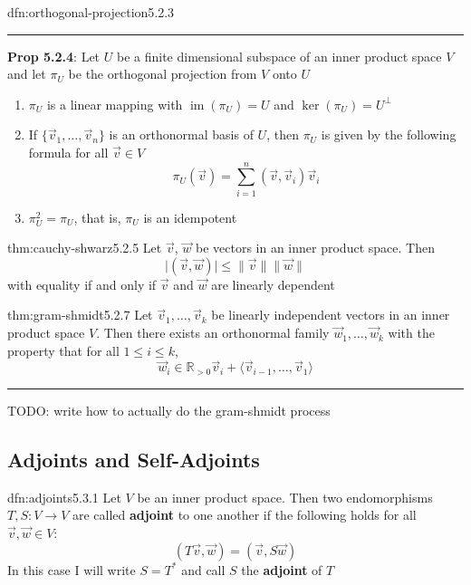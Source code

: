 \documentclass[landscape, 8pt]{extarticle}
\DeclareMathOperator{\im}{im}
\begin{document}
\begin{multicols}{3}
\begin{dfn}{dfn:orthogonal-projection}{5.2.3}
    \noindent\rule{\textwidth}{0.2pt}
    \textbf{Prop 5.2.4}: Let $U$ be a finite dimensional subspace of an inner product space $V$ and let $\pi_{U}$ be the orthogonal projection from $V$ onto $U$
    \begin{enumerate}
        \setlength\itemsep{0em}
        \item $\pi_{U}$ is a linear mapping with $\im(\pi_{U}) = U$ and $\ker (\pi_{U}) = U^{\bot}$
        \item If $\{\vec{v}_{1},\dots,\vec{v}_{n}\}$ is an orthonormal basis of $U$, then $\pi_{U}$ is given by the following formula for all $\vec{v}\in V$
            \[\pi_{U}(\vec{v}) = \sum_{i = 1}^{n} (\vec{v}, \vec{v}_{i}) \vec{v}_{i}\]
        \item $\pi_{U}^{2} = \pi_{U}$, that is, $\pi_{U}$ is an idempotent
    \end{enumerate}
\end{dfn}

\begin{thm}{thm:cauchy-shwarz}{5.2.5}
    Let $\vec{v}$, $\vec{w}$ be vectors in an inner product space. Then
    \[\lvert (\vec{v}, \vec{w}) \rvert \le \lVert \vec{v} \rVert \lVert \vec{w} \rVert\]
    with equality if and only if $\vec{v}$ and $\vec{w}$ are linearly dependent
\end{thm}

\begin{thm}{thm:gram-shmidt}{5.2.7}
    Let $\vec{v}_{1},\dots,\vec{v}_{k}$ be linearly independent vectors in an inner product space $V$. Then there exists an orthonormal family $\vec{w}_{1},\dots,\vec{w}_{k}$ with the property that for all $1 \le i \le k$,
    \[\vec{w}_{i} \in \mathbb{R}_{>0} \vec{v}_{i} + \langle \vec{v}_{i - 1},\dots,\vec{v}_{1} \rangle\]

    \noindent\rule{\textwidth}{0.2pt}
    TODO: write how to actually do the gram-shmidt process
\end{thm}

\subsection{Adjoints and Self-Adjoints}

\begin{dfn}[Adjoints]{dfn:adjoints}{5.3.1}
    Let $V$ be an inner product space. Then two endomorphisms $T, S : V\to V$ are called \textbf{adjoint} to one another if the following holds for all $\vec{v}, \vec{w}\in V$:
    \[(T \vec{v}, \vec{w}) = (\vec{v}, S\vec{w})\]
    In this case I will write $S = T^{*}$ and call $S$ the \textbf{adjoint} of $T$


\end{dfn}
\end{multicols}
\end{document}
